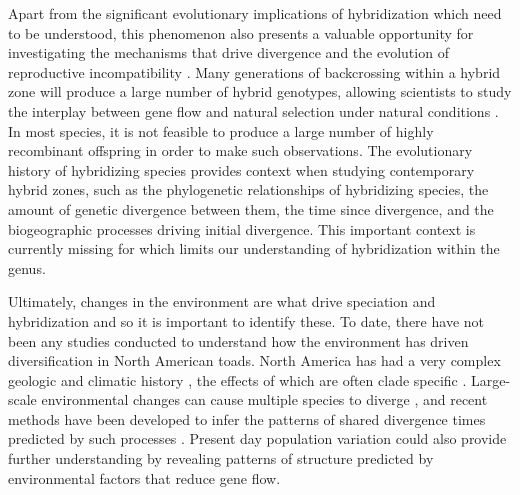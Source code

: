 Apart from the significant evolutionary implications of hybridization which 
need to be understood, this phenomenon also presents a valuable opportunity for investigating 
the mechanisms that drive divergence and the evolution of reproductive
incompatibility \parencite{rieseberg1999}. 
Many generations of backcrossing within a hybrid zone will produce a large number 
of hybrid genotypes, allowing scientists to study the interplay between gene 
flow and natural selection under natural conditions \parencite{rieseberg1999}. 
In most species, it is not feasible to produce a large number of highly  
recombinant offspring in order to make such observations.
The evolutionary history of hybridizing species provides context when studying 
contemporary hybrid zones, such as the phylogenetic relationships of hybridizing species, 
the amount of genetic divergence between them,  
the time since divergence, and the biogeographic 
processes driving initial divergence.
This important context is currently missing for \anaxyrus which limits our
understanding of hybridization within the genus.


Ultimately, changes in the environment are what drive speciation and hybridization
and so it is important to identify these.
To date, there have not been any studies conducted to understand how the 
environment has driven diversification in North American toads. 
North America has had a very complex geologic and climatic history \parencite{lyman2022},
the effects of which are often clade specific \parencite{nunez2023}.
Large-scale environmental changes can cause multiple species to diverge \parencite{oaks2019,xue2015}, 
and recent methods have been developed to infer the patterns of shared divergence 
times predicted by such processes \parencite{oaks2019,oaks2022}.
Present day population variation could also provide further understanding 
by revealing patterns of structure predicted by environmental factors that 
reduce gene flow.



